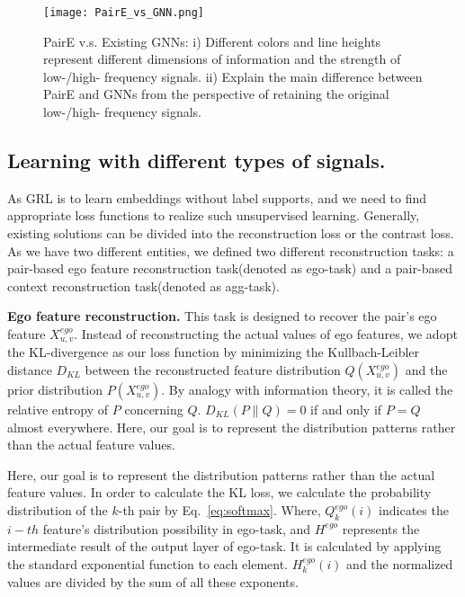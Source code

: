 \documentclass[10pt,journal,compsoc]{IEEEtran}
\begin{document}
\begin{figure}[h]
\centering
 \texttt{[image: PairE\_vs\_GNN.png]}
\centering
\caption{PairE v.s. Existing GNNs: i) Different colors and line heights represent different dimensions of information and the strength of low-/high- frequency signals. ii) Explain the main difference between PairE and GNNs from the perspective of retaining the original low-/high- frequency signals.}
\vspace{-0.2cm}
\label{fig:compare}
\end{figure}
\subsection{Learning with different types of signals.} As GRL is to learn embeddings without label supports, and we need to find appropriate loss functions to realize such unsupervised learning. Generally, existing solutions can be divided into the reconstruction loss\cite{Veli17_GAT} or the contrast loss\cite{hamilton_grapshsage, Veli18_dgi}. As we have two different entities, we defined two different reconstruction tasks: a pair-based ego feature reconstruction task(denoted as ego-task) and a pair-based context reconstruction task(denoted as agg-task).
   
 \noindent\textbf{Ego feature reconstruction.} This task is designed to recover the pair's ego feature $X_{u,v}^{ego}$. Instead of reconstructing the actual values of ego features, we adopt the KL-divergence as our loss function by minimizing the Kullbach-Leibler distance $D_{KL}$ between the reconstructed feature distribution $Q({X}_{u,v}^{ego})$ and the prior distribution $P(X_{u,v}^{ego})$. By analogy with information theory, it is called the relative entropy of $P$ concerning  $Q$.  $ D_{KL}({P\parallel Q}) = 0 $ if and only if $P=Q$ almost everywhere. Here, our goal is to represent the distribution patterns rather than the actual feature values. 
 
 Here, our goal is to represent the distribution patterns rather than the actual feature values. In order to calculate the KL loss, we calculate the probability distribution of the $k$-th pair by Eq.~\ref{eq:softmax}. Where, $Q_k^{ego}(i)$ indicates the $i-{th}$ feature's distribution possibility in ego-task, and $H^{ego}$ represents the intermediate result of the output layer of ego-task. It is calculated by applying the standard exponential function to each element. $H^{ego}_k(i)$ and the normalized values are divided by the sum of all these exponents.
 
\end{document}

